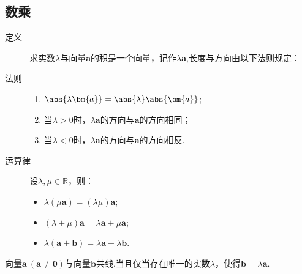   \subsection{数乘}
    \begin{description}
      \item[定义] 求实数$ \lambda $与向量$\bm{a}$的积是一个向量，记作$\lambda\bm{a}$,长度与方向由以下法则规定：
      \item[法则]
      \begin{enumerate}[label=\arabic*)]
        \item $\abs{\lambda \bm{a}}=\abs{\lambda}\abs{\bm{a}} $;
        \item 当$ \lambda>0 $时，$ \lambda\bm{a} $的方向与$\bm{a}$的方向相同；
        \item 当$ \lambda<0 $时，$ \lambda\bm{a} $的方向与$\bm{a}$的方向相反.
      \end{enumerate}
      \item[运算律]
      设$\lambda,\mu\in\mathbb{R}$，则：\par
      \begin{itemize}
          \item $\lambda(\mu\bm{a})=(\lambda\mu)\bm{a}$;
          \item $(\lambda+\mu)\bm{a}=\lambda\bm{a}+\mu\bm{a}$;
          \item $\lambda(\bm{a}+\bm{b})=\lambda\bm{a}+\lambda\bm{b}$.
      \end{itemize}
    \end{description}
    \begin{Theorem}[向量共线定理]
      向量$\bm{a}~(\bm{a}\ne\bm{0})$与向量$\bm{b}$共线,当且仅当存在唯一的实数$ \lambda $，使得$\bm{b}=\lambda\bm{a}$.
    \end{Theorem}
